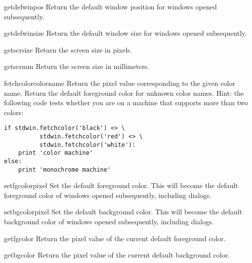 \begin{funcdesc}{getdefwinpos}{}
Return the default window position for windows opened subsequently.
\end{funcdesc}

\begin{funcdesc}{getdefwinsize}{}
Return the default window size for windows opened subsequently.
\end{funcdesc}

\begin{funcdesc}{getscrsize}{}
Return the screen size in pixels.
\end{funcdesc}

\begin{funcdesc}{getscrmm}{}
Return the screen size in millimeters.
\end{funcdesc}

\begin{funcdesc}{fetchcolor}{colorname}
Return the pixel value corresponding to the given color name.
Return the default foreground color for unknown color names.
Hint: the following code tests whether you are on a machine that
supports more than two colors:
\begin{verbatim}
if stdwin.fetchcolor('black') <> \
          stdwin.fetchcolor('red') <> \
          stdwin.fetchcolor('white'):
    print 'color machine'
else:
    print 'monochrome machine'
\end{verbatim}
\end{funcdesc}

\begin{funcdesc}{setfgcolor}{pixel}
Set the default foreground color.
This will become the default foreground color of windows opened
subsequently, including dialogs.
\end{funcdesc}

\begin{funcdesc}{setbgcolor}{pixel}
Set the default background color.
This will become the default background color of windows opened
subsequently, including dialogs.
\end{funcdesc}

\begin{funcdesc}{getfgcolor}{}
Return the pixel value of the current default foreground color.
\end{funcdesc}

\begin{funcdesc}{getbgcolor}{}
Return the pixel value of the current default background color.
\end{funcdesc}

